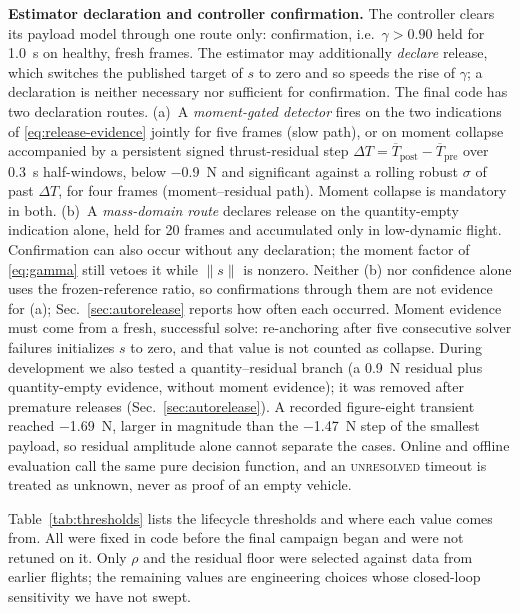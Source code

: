 \documentclass[conference]{IEEEtran}
\begin{document}
\textbf{Estimator declaration and controller confirmation.} The controller clears its payload
model through one route only: confirmation, i.e.\ $\gamma>0.90$ held for \SI{1.0}{s} on healthy,
fresh frames. The estimator may additionally \emph{declare} release, which switches the
published target of $s$ to zero and so speeds the rise of $\gamma$; a declaration is neither
necessary nor sufficient for confirmation. The final code has two declaration routes.
(a)~A \emph{moment-gated detector} fires on the two indications of
\eqref{eq:release-evidence} jointly for five frames (slow path), or on moment collapse
accompanied by a persistent signed thrust-residual step
$\Delta T=\overline{T}_{\mathrm{post}}-\overline{T}_{\mathrm{pre}}$ over \SI{0.3}{s}
half-windows, below \SI{-0.9}{N} and significant against a rolling robust $\sigma$ of past
$\Delta T$, for four frames (moment--residual path). Moment collapse is mandatory in both.
(b)~A \emph{mass-domain route} declares release on the quantity-empty indication alone, held
for 20 frames and accumulated only in low-dynamic flight. Confirmation can
also occur without any declaration; the moment factor of \eqref{eq:gamma} still vetoes it while
$\lVert s\rVert$ is nonzero. Neither (b) nor confidence alone
uses the frozen-reference ratio, so confirmations through them are not evidence for (a);
Sec.~\ref{sec:autorelease} reports how often each occurred. Moment evidence must come from a
fresh, successful solve: re-anchoring after five consecutive solver failures initializes $s$
to zero, and that value is not counted as collapse. During development we also tested a
quantity--residual branch (a \SI{0.9}{N} residual plus quantity-empty evidence, without moment
evidence); it was removed after premature releases (Sec.~\ref{sec:autorelease}). A recorded
figure-eight transient reached \SI{-1.69}{N}, larger in magnitude than the \SI{-1.47}{N} step of
the smallest payload, so residual amplitude alone cannot separate the cases. Online and offline
evaluation call the same pure decision function, and an \textsc{unresolved} timeout is treated
as unknown, never as proof of an empty vehicle.

Table~\ref{tab:thresholds} lists the lifecycle thresholds and where each value comes from. All
were fixed in code before the final campaign began and were not retuned on it. Only $\rho$ and
the residual floor were selected against data from earlier flights; the remaining values are
engineering choices whose closed-loop sensitivity we have not swept.
\end{document}
